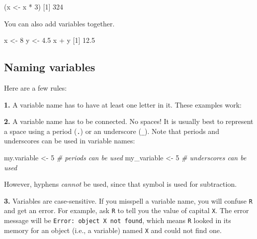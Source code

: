\documentclass[
]{book}
\newenvironment{Shaded}{\begin{snugshade}}{\end{snugshade}}
\newcommand{\CommentTok}[1]{\textcolor[rgb]{0.56,0.35,0.01}{\textit{#1}}}
\newcommand{\DecValTok}[1]{\textcolor[rgb]{0.00,0.00,0.81}{#1}}
\newcommand{\FloatTok}[1]{\textcolor[rgb]{0.00,0.00,0.81}{#1}}
\newcommand{\NormalTok}[1]{#1}
\newcommand{\OtherTok}[1]{\textcolor[rgb]{0.56,0.35,0.01}{#1}}
\newcommand{\SpecialCharTok}[1]{\textcolor[rgb]{0.00,0.00,0.00}{#1}}
\begin{document}
\begin{Shaded}
\begin{Highlighting}[]
\NormalTok{(x }\OtherTok{\textless{}{-}}\NormalTok{ x }\SpecialCharTok{*} \DecValTok{3}\NormalTok{)}
\NormalTok{[}\DecValTok{1}\NormalTok{] }\DecValTok{324}
\end{Highlighting}
\end{Shaded}

You can also add variables together.

\begin{Shaded}
\begin{Highlighting}[]
\NormalTok{x }\OtherTok{\textless{}{-}} \DecValTok{8}
\NormalTok{y }\OtherTok{\textless{}{-}} \FloatTok{4.5}
\NormalTok{x }\SpecialCharTok{+}\NormalTok{ y}
\NormalTok{[}\DecValTok{1}\NormalTok{] }\FloatTok{12.5}
\end{Highlighting}
\end{Shaded}

\hypertarget{naming-variables}{%
\subsection*{Naming variables}\label{naming-variables}}

Here are a few rules:

\textbf{1.} A variable name has to have at least one letter in it. These examples work:

\textbf{2.} A variable name has to be connected. No spaces! It is usually best to represent a space using a period (\texttt{.}) or an underscore (\texttt{\_}). Note that periods and underscores can be used in variable names:

\begin{Shaded}
\begin{Highlighting}[]
\NormalTok{my.variable }\OtherTok{\textless{}{-}} \DecValTok{5} \CommentTok{\# periods can be used}
\NormalTok{my\_variable }\OtherTok{\textless{}{-}} \DecValTok{5} \CommentTok{\# underscores can be used}
\end{Highlighting}
\end{Shaded}

However, hyphens \emph{cannot} be used, since that symbol is used for subtraction.

\textbf{3.} Variables are case-sensitive. If you misspell a variable name, you will confuse \texttt{R} and get an error. For example, ask \texttt{R} to tell you the value of capital \texttt{X}. The error message will be \texttt{Error:\ object\ \textquotesingle{}X\textquotesingle{}\ not\ found}, which means \texttt{R} looked in its memory for an object (i.e., a variable) named \texttt{X} and could not find one.
\end{document}
